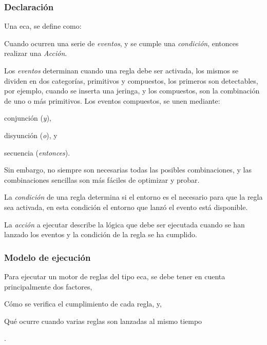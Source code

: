 \subsubsection{Declaración}

Una \gls{eca}, se define como\cite{bailey2004event,behrends2006combining}:

\begin{displayquote}
	 Cuando ocurren una serie de \emph{eventos}, y se cumple una
	 \emph{condición}, entonces realizar una \emph{Acción}.
\end{displayquote}

Los \emph{eventos} determinan cuando una regla debe ser activada, los mismos se
dividen en dos categorías\cite{behrends2006combining}, primitivos y compuestos,
los primeros son detectables, por ejemplo, cuando se inserta una jeringa, y los
compuestos, son la combinación de uno o más
primitivos\cite{bailey2004event,behrends2006combining}. Los eventos
compuestos, se unen mediante:
\begin{enumerate*}[label=\itshape\alph*\upshape)]
\item conjunción (\emph{y}),
\item disyunción (\emph{o}), y
\item secuencia (\emph{entonces}).
\end{enumerate*}
Sin embargo, no siempre son necesarias todas las posibles combinaciones, y las
combinaciones sencillas son más fáciles de optimizar y
probar\cite{bailey2004event}.

La \emph{condición} de una regla determina si el entorno es el necesario para que la
regla sea activada, en esta condición el entorno que lanzó el evento está
disponible.

La \emph{acción} a ejecutar describe la lógica que debe ser ejecutada cuando se han
lanzado los eventos y la condición de la regla se ha cumplido.

\subsubsection{Modelo de ejecución}
\label{sec:eca_ejecucion}

Para ejecutar un motor de reglas del tipo \gls{eca}, se debe tener en cuenta
principalmente dos factores, 
\begin{enumerate*}[label=\itshape\alph*\upshape)]
\item  Cómo se verifica el cumplimiento de cada regla, y, 
\item  Qué ocurre cuando varias reglas son lanzadas al mismo tiempo
\end{enumerate*}.


